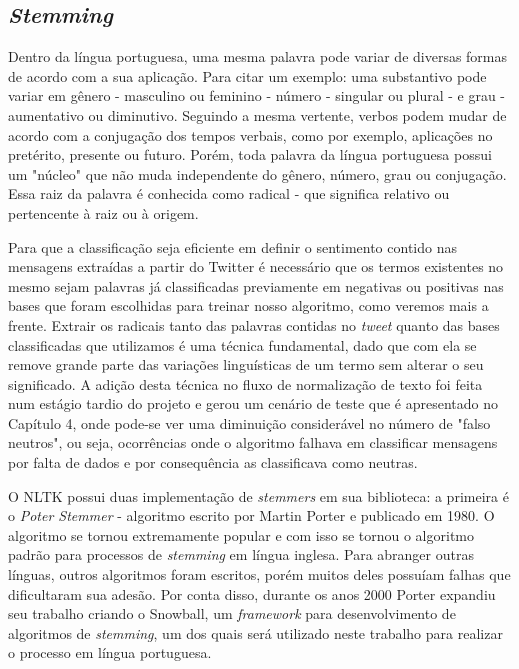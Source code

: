 \subsection{\textit{Stemming}}

Dentro da língua portuguesa, uma mesma palavra pode variar de diversas formas de acordo com a sua aplicação. Para citar um exemplo: uma substantivo pode variar em gênero - masculino ou feminino - número - singular ou plural - e grau - aumentativo ou diminutivo. Seguindo a mesma vertente, verbos podem mudar de acordo com a conjugação dos tempos verbais, como por exemplo, aplicações no pretérito, presente ou futuro.
Porém, toda palavra da língua portuguesa possui um "núcleo" que não muda independente do gênero, número, grau ou conjugação. Essa raiz da palavra é conhecida como radical - que significa relativo ou pertencente à raiz ou à origem. 

Para que a classificação seja eficiente em definir o sentimento contido nas mensagens extraídas a partir do Twitter é necessário que os termos existentes no mesmo sejam palavras já classificadas previamente em negativas ou positivas nas bases que foram escolhidas para treinar nosso algoritmo, como veremos mais a frente. Extrair os radicais tanto das palavras contidas no \textit{tweet} quanto das bases classificadas que utilizamos é uma técnica fundamental, dado que com ela se remove grande parte das variações linguísticas de um termo sem alterar o seu significado. A adição desta técnica no fluxo de normalização de texto foi feita num estágio tardio do projeto e gerou um cenário de teste que é apresentado no Capítulo 4, onde pode-se ver uma diminuição considerável no número de "falso neutros", ou seja, ocorrências onde o algoritmo falhava em classificar mensagens por falta de dados e por consequência as classificava como neutras.

O NLTK possui duas implementação de \textit{stemmers} em sua biblioteca: a primeira é o \textit{Poter Stemmer} - algoritmo escrito por Martin Porter e publicado em 1980. O algoritmo se tornou extremamente popular e com isso se tornou o algoritmo padrão para processos de \textit{stemming} em língua inglesa. Para abranger outras línguas, outros algoritmos foram escritos, porém muitos deles possuíam falhas que dificultaram sua adesão. Por conta disso, durante os anos 2000 Porter expandiu seu trabalho criando o Snowball\cite{snowball}, um \textit{framework} para desenvolvimento de algoritmos de \textit{stemming}, um dos quais será utilizado neste trabalho para realizar o processo em língua portuguesa. 


